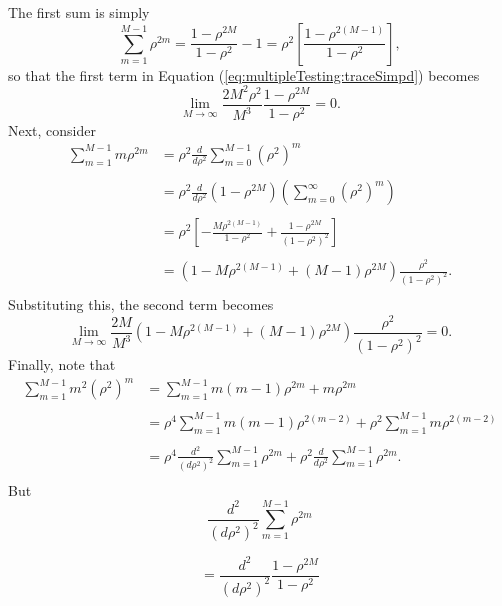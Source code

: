 \documentclass[letterpaper,12pt,oneside,final]{article}
\begin{document}
The first sum is simply
\begin{equation} \label{eq:multipleTesting:rhoFirstSum}
  \sum_{m = 1}^{M-1} \rho^{2m} = \frac{1 - \rho^{2M}}{1 - \rho^2} - 1 = \rho^2 \left [ \frac{1 - \rho^{2(M-1)}}{1 - \rho^2} \right ],
\end{equation}
so that the first term in Equation (\ref{eq:multipleTesting:traceSimpd}) becomes
$$\lim_{M \rightarrow \infty} \frac{2M^2\rho^2}{M^3} \frac{1 - \rho^{2M}}{1 - \rho^2} = 0.$$
Next, consider
\begin{equation}
  \begin{aligned}
    \sum_{m=1}^{M-1} m \rho^{2m} & = \rho^2 \frac{d}{d\rho^2} \sum_{m = 0}^{M-1} \left ( \rho^2 \right )^m \\
    & \\
    & = \rho^2 \frac{d}{d\rho^2} (1 - \rho^{2M}) \left ( \sum_{m = 0}^{\infty} (\rho^2)^m \right ) \\
    & \\
    & = \rho^2 \left [ -\frac{M\rho^{2(M-1)}}{1 - \rho^2} + \frac{1 - \rho^{2M}}{(1 - \rho^2)^2} \right ] \\
    & \\
    & = \left ( 1 - M\rho^{2(M-1)} + (M - 1)\rho^{2M} \right ) \frac{\rho^2}{(1 - \rho^2)^2}. \\
  \end{aligned}
\end{equation}
Substituting this, the second term becomes
$$\lim_{M \rightarrow \infty} \frac{2M}{M^3}(1 - M\rho^{2(M-1)} + (M-1)\rho^{2M}) \frac{\rho^2}{(1 - \rho^2)^2} = 0.$$
Finally, note that
\begin{equation} \label{eq:multipleTesting:squareSum}
  \begin{aligned}
    \sum_{m = 1}^{M-1} m^2 (\rho^2)^m & = \sum_{m=1}^{M-1} m(m-1) \rho^{2m} + m \rho^{2m} \\
    & \\
    & = \rho^4 \sum_{m=1}^{M-1} m(m-1) \rho^{2(m-2)} +  \rho^2 \sum_{m = 1}^{M-1} m \rho^{2(m-2)} \\
    & \\
    & = \rho^4 \frac{d^2}{(d\rho^2)^2} \sum_{m = 1}^{M-1} \rho^{2m} + \rho^2  \frac{d}{d\rho^2} \sum_{m=1}^{M-1} \rho^{2m} . \\
  \end{aligned}
\end{equation}
But
$$\frac{d^2}{(d\rho^2)^2} \sum_{m = 1}^{M-1} \rho^{2m}$$

$$= \frac{d^2}{(d\rho^2)^2} \frac{1  - \rho^{2M}}{1 - \rho^2}$$
\end{document}
